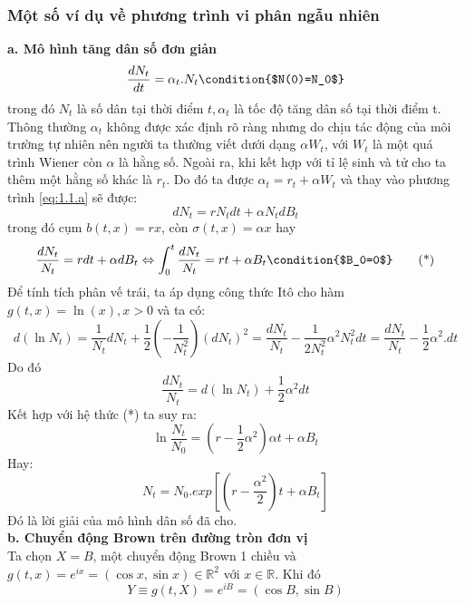 \documentclass[a4paper]{article}
\numberwithin{equation}{section}
\begin{document}
\subsubsection{Một số ví dụ về phương trình vi phân ngẫu nhiên}
\textbf{a. Mô hình tăng dân số đơn giản}
\begin{equation}\label{eq:1.1.a}
	\dfrac{dN_t}{dt}=\alpha_t.N_t \condition{$N(0)=N_0$}
\end{equation}
trong đó $N_t$ là số dân tại thời điểm $t,\alpha_t$ là tốc độ tăng dân số tại thời điểm t. Thông thường $\alpha_t$ không được xác định rõ ràng nhưng do chịu tác động của môi trường tự nhiên nên người ta thường viết dưới dạng $\alpha W_t$, với $W_t$ là một quá trình Wiener còn $\alpha$ là hằng số. Ngoài ra, khi kết hợp với tỉ lệ sinh và tử cho ta thêm một hằng số khác là $r_t$. Do đó ta được $\alpha_t=r_t+\alpha W_t$ và thay vào phương trình \eqref{eq:1.1.a} sẽ được:
\begin{equation*}
	dN_t=rN_tdt+\alpha N_tdB_t
\end{equation*}
trong đó cụm $b(t,x)=rx$, còn $\sigma(t,x)=\alpha x$ hay
\begin{equation*}
	\dfrac{dN_t}{N_t}=rdt+\alpha dB_t\Leftrightarrow\int_0^t\dfrac{dN_t}{N_t}=rt+\alpha B_t \condition{$B_0=0$}\tag{*}
\end{equation*}
Để tính tích phân vế trái, ta áp dụng công thức Itô cho hàm $g(t,x)=\ln(x),x>0$ và ta có:
\begin{dmath*}
	d(\ln N_t)=\dfrac{1}{N_t}dN_t+\dfrac{1}{2}(-\dfrac{1}{N_t^2})(dN_t)^2=\dfrac{dN_t}{N_t}-\dfrac{1}{2N_t^2}\alpha^2N_t^2dt=\dfrac{dN_t}{N_t}-\dfrac{1}{2}\alpha^2.dt
\end{dmath*}
Do đó
\begin{equation*}
	\dfrac{dN_t}{N_t}=d(\ln N_t)+\dfrac{1}{2}\alpha^2dt
\end{equation*}
Kết hợp với hệ thức (*) ta suy ra:
\begin{equation*}
	\ln\dfrac{N_t}{N_0}=(r-\dfrac{1}{2}\alpha^2)\alpha t+\alpha B_t
\end{equation*}
Hay:
\begin{equation*}
	N_t=N_0.exp[(r-\dfrac{\alpha^2}{2})t+\alpha B_t]
\end{equation*}
Đó là lời giải của mô hình dân số đã cho.\\
\textbf{b. Chuyển động Brown trên đường tròn đơn vị}\\
Ta chọn $X=B$, một chuyển động Brown 1 chiều và $g(t,x)=e^{ix}=(\cos{x},\sin{x})\in\mathbb{R}^2$ với $x\in\mathbb{R}$. Khi đó
\begin{equation*}
	Y\equiv g(t,X)=e^{iB}=(\cos{B},\sin{B})
\end{equation*} 
\end{document}

